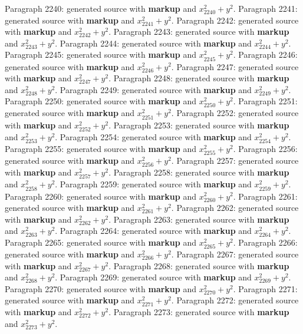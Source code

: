 \documentclass{article}
\begin{document}
Paragraph 2240: generated source with \textbf{markup} and $x_{2240}^2 + y^2$.
Paragraph 2241: generated source with \textbf{markup} and $x_{2241}^2 + y^2$.
Paragraph 2242: generated source with \textbf{markup} and $x_{2242}^2 + y^2$.
Paragraph 2243: generated source with \textbf{markup} and $x_{2243}^2 + y^2$.
Paragraph 2244: generated source with \textbf{markup} and $x_{2244}^2 + y^2$.
Paragraph 2245: generated source with \textbf{markup} and $x_{2245}^2 + y^2$.
Paragraph 2246: generated source with \textbf{markup} and $x_{2246}^2 + y^2$.
Paragraph 2247: generated source with \textbf{markup} and $x_{2247}^2 + y^2$.
Paragraph 2248: generated source with \textbf{markup} and $x_{2248}^2 + y^2$.
Paragraph 2249: generated source with \textbf{markup} and $x_{2249}^2 + y^2$.
Paragraph 2250: generated source with \textbf{markup} and $x_{2250}^2 + y^2$.
Paragraph 2251: generated source with \textbf{markup} and $x_{2251}^2 + y^2$.
Paragraph 2252: generated source with \textbf{markup} and $x_{2252}^2 + y^2$.
Paragraph 2253: generated source with \textbf{markup} and $x_{2253}^2 + y^2$.
Paragraph 2254: generated source with \textbf{markup} and $x_{2254}^2 + y^2$.
Paragraph 2255: generated source with \textbf{markup} and $x_{2255}^2 + y^2$.
Paragraph 2256: generated source with \textbf{markup} and $x_{2256}^2 + y^2$.
Paragraph 2257: generated source with \textbf{markup} and $x_{2257}^2 + y^2$.
Paragraph 2258: generated source with \textbf{markup} and $x_{2258}^2 + y^2$.
Paragraph 2259: generated source with \textbf{markup} and $x_{2259}^2 + y^2$.
Paragraph 2260: generated source with \textbf{markup} and $x_{2260}^2 + y^2$.
Paragraph 2261: generated source with \textbf{markup} and $x_{2261}^2 + y^2$.
Paragraph 2262: generated source with \textbf{markup} and $x_{2262}^2 + y^2$.
Paragraph 2263: generated source with \textbf{markup} and $x_{2263}^2 + y^2$.
Paragraph 2264: generated source with \textbf{markup} and $x_{2264}^2 + y^2$.
Paragraph 2265: generated source with \textbf{markup} and $x_{2265}^2 + y^2$.
Paragraph 2266: generated source with \textbf{markup} and $x_{2266}^2 + y^2$.
Paragraph 2267: generated source with \textbf{markup} and $x_{2267}^2 + y^2$.
Paragraph 2268: generated source with \textbf{markup} and $x_{2268}^2 + y^2$.
Paragraph 2269: generated source with \textbf{markup} and $x_{2269}^2 + y^2$.
Paragraph 2270: generated source with \textbf{markup} and $x_{2270}^2 + y^2$.
Paragraph 2271: generated source with \textbf{markup} and $x_{2271}^2 + y^2$.
Paragraph 2272: generated source with \textbf{markup} and $x_{2272}^2 + y^2$.
Paragraph 2273: generated source with \textbf{markup} and $x_{2273}^2 + y^2$.
\end{document}
